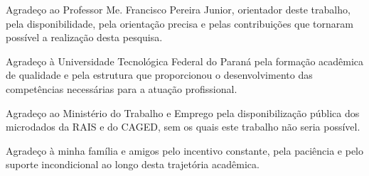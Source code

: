 
\begin{agradecimentos}[AGRADECIMENTOS]

Agradeço ao Professor Me. Francisco Pereira Junior, orientador deste trabalho, pela disponibilidade, pela orientação precisa e pelas contribuições que tornaram possível a realização desta pesquisa.

Agradeço à Universidade Tecnológica Federal do Paraná pela formação acadêmica de qualidade e pela estrutura que proporcionou o desenvolvimento das competências necessárias para a atuação profissional.

Agradeço ao Ministério do Trabalho e Emprego pela disponibilização pública dos microdados da RAIS e do CAGED, sem os quais este trabalho não seria possível.

Agradeço à minha família e amigos pelo incentivo constante, pela paciência e pelo suporte incondicional ao longo desta trajetória acadêmica.

\end{agradecimentos}
